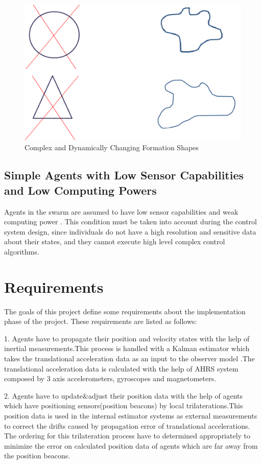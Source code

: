 \begin{figure}[H]
\caption{Complex and Dynamically Changing Formation Shapes}
\centering
\includegraphics[scale = 1]{complex}
\end{figure}

\subsection{Simple Agents with Low Sensor Capabilities and Low Computing Powers}
Agents in the swarm are assumed to have low sensor capabilities and weak computing power \cite{6}. This condition must be taken into account during the control system design, since individuals do not have a high resolution and sensitive data about their states, and they cannot execute high level complex control algorithms.

\section{Requirements}
The goals of this project define some requirements about the implementation phase of the project. These requirements are listed as follows:

1. Agents have to propagate their position and velocity states with the help of inertial measurements.This process is handled with a Kalman estimator which takes the translational acceleration data as an input to the observer model .The translational acceleration data is calculated with the help of AHRS system composed by 3 axis accelerometers, gyroscopes and magnetometers. 

2. Agents have to update$\&$adjust their position data with the help of agents which have positioning sensors(position beacons) by local trilaterations.This position data is used in the internal estimator systems as external measurements to correct the drifts caused by propagation error of translational accelerations.  The ordering for this trilateration process have to determined appropriately to minimize the error on calculated position data of agents which are far away from the position beacons.

